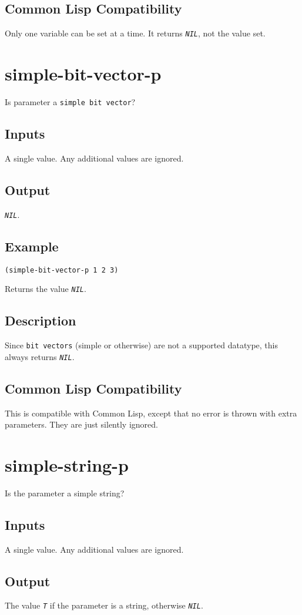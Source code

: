 \documentclass[10pt, openany]{book}
\newcommand{\constant}[1]{\emph{\texttt{#1}}}
\newcommand{\datatype}[1]{\texttt{#1}}
\newcommand{\cl}{Common Lisp}
\begin{document}
\subsection{Common Lisp Compatibility}
Only one variable can be set at a time.  It returns \constant{NIL}, not the value set.

\section{simple-bit-vector-p}
Is parameter a \datatype{simple bit vector}?
\subsection{Inputs}
A single value.  Any additional values are ignored.
\subsection{Output}
\constant{NIL}.
\subsection{Example}
\begin{lstlisting}
(simple-bit-vector-p 1 2 3)
\end{lstlisting}
Returns the value \constant{NIL}.
\subsection{Description}
Since \datatype{bit vectors} (simple or otherwise) are not a supported datatype, this always returns \constant{NIL}.
\subsection{Common Lisp Compatibility}
This is compatible with \cl, except that no error is thrown with extra parameters.  They are just silently ignored.

\section{simple-string-p}
Is the parameter a simple string?
\subsection{Inputs}
A single value.  Any additional values are ignored.
\subsection{Output}
The value \constant{T} if the parameter is a string, otherwise \constant{NIL}.
\end{document}
